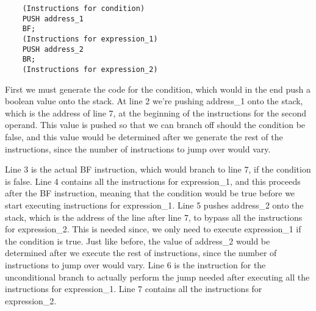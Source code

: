 \documentclass{article}
\begin{document}
\begin{lstlisting}
    (Instructions for condition)
    PUSH address_1
    BF;
    (Instructions for expression_1)
    PUSH address_2
    BR;
    (Instructions for expression_2)
\end{lstlisting}

First we must generate the code for the condition, which would in the end push a boolean value onto the stack. At line 2 we're pushing address\_1 onto the stack, which is the address of line 7, at the beginning of the instructions for the second operand. This value is pushed so that we can branch off should the condition be false, and this value would be determined after we generate the rest of the instructions, since the number of instructions to jump over would vary.

Line 3 is the actual BF instruction, which would branch to line 7, if the condition is false. Line 4 contains all the instructions for expression\_1, and this proceeds after the BF instruction, meaning that the condition would be true before we start executing instructions for expression\_1. Line 5 pushes address\_2 onto the stack, which is the address of the line after line 7, to bypass all the instructions for expression\_2. This is needed since, we only need to execute expression\_1 if the condition is true. Just like before, the value of address\_2 would be determined after we execute the rest of instructions, since the number of instructions to jump over would vary. Line 6 is the instruction for the unconditional branch to actually perform the jump needed after executing all the instructions for expression\_1. Line 7 contains all the instructions for expression\_2.
\end{document}

